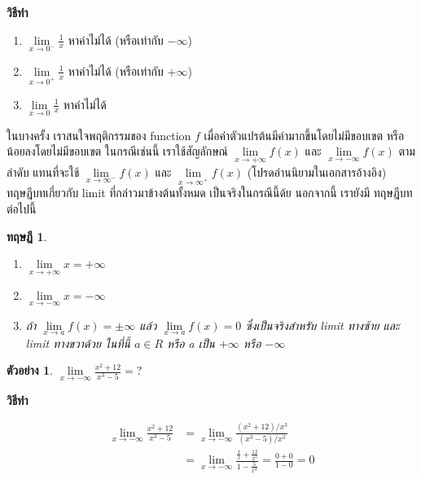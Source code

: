 \documentclass[
]{book}
\newtheorem{theorem}{ทฤษฎี}[chapter]
\theoremstyle{definition}
\theoremstyle{definition}
\newtheorem{example}{ตัวอย่าง}[chapter]
\theoremstyle{definition}
\theoremstyle{definition}
\theoremstyle{remark}
\begin{document}
\textbf{วิธีทำ}

\begin{enumerate}
\def\labelenumi{\arabic{enumi}.}
\item
  \(\underset{x\rightarrow 0^{-}}{\lim}\frac{1}{x}\) หาค่าไม่ได้ (หรือเท่ากับ
  \(-\infty\))
\item
  \(\underset{x\rightarrow 0^{+}}{\lim}\frac{1}{x}\) หาค่าไม่ได้ (หรือเท่ากับ
  \(+\infty\))
\item
  \(\underset{x\rightarrow 0}{\lim}\frac{1}{x}\) หาค่าไม่ได้
\end{enumerate}

ในบางครั้ง เราสนใจพฤติกรรมของ function \(f\) เมื่อค่าตัวแปรต้นมีค่ามากขึ้นโดยไม่มีขอบเขต
หรือน้อยลงโดยไม่มีขอบเขต ในกรณีเช่นนี้ เราใช้สัญลักษณ์
\(\underset{x\rightarrow +\infty }{\lim}f\left( x\right)\) และ
\(\underset{x\rightarrow -\infty }{\lim}f\left( x\right)\) ตามลำดับ
แทนที่จะใช้ \(\underset{x\rightarrow \infty ^{-}}{\lim}f\left( x\right)\) และ
\(\underset{x\rightarrow \infty ^{+}}{\lim}f\left( x\right)\)
(โปรดอ่านนิยามในเอกสารอ้างอิง) ทฤษฎีบทเกี่ยวกับ limit ที่กล่าวมาข้างต้นทั้งหมด
เป็นจริงในกรณีนี้ด้ย นอกจากนี้ เรายังมี ทฤษฎีบทต่อไปนี้

\begin{theorem}
\protect\hypertarget{thm:thm-limit-5}{}\label{thm:thm-limit-5}\leavevmode

\begin{enumerate}
\def\labelenumi{\arabic{enumi}.}
\item
  \(\underset{x\rightarrow +\infty }{\lim}x=+\infty\)
\item
  \(\underset{x\rightarrow -\infty }{\lim}x=-\infty\)
\item
  ถ้า \(\underset{x\rightarrow a}{\lim}f\left( x\right) =\pm \infty\) แล้ว
  \(\underset{x\rightarrow a}{\lim}f\left( x\right) =0\) ซึ่งเป็นจริงสำหรับ
  limit ทางซ้าย และ limit ทางขวาด้วย ในที่นี้ \(a\in R\) หรือ a เป็น \(+\infty\)
  หรือ \(-\infty\)
\end{enumerate}

\end{theorem}

\begin{example}
\protect\hypertarget{exm:ex-limit-7}{}\label{exm:ex-limit-7}\(\underset{x\rightarrow -\infty }{\lim}\frac{x^{2}+12}{x^{3}-5}=?\)
\end{example}

\textbf{วิธีทำ}

\begin{equation}
  \begin{aligned}
    \underset{x\rightarrow -\infty }{\lim}\frac{x^{2}+12}{x^{3}-5}
        &=\underset{x\rightarrow -\infty }{\lim}\frac{\left( x^{2}+12\right) /x^{3}}{\left( x^{3}-5\right) /x^{3}} \\
        &=\underset{x\rightarrow -\infty }{\lim}\frac{\frac{1}{x}+\frac{12}{x^{3}}}{1-\frac{5}{x^{3}}}
    =\frac{0+0}{1-0}=0
  \end{aligned}
\end{equation}
\end{document}
